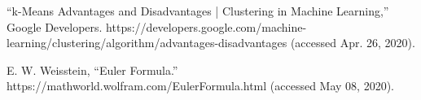 \documentclass[conference]{IEEEtran}
\begin{document}
\begin{thebibliography}{00}


 “k-Means Advantages and Disadvantages | Clustering in Machine Learning,” Google Developers. https://developers.google.com/machine-learning/clustering/algorithm/advantages-disadvantages (accessed Apr. 26, 2020).

E. W. Weisstein, “Euler Formula.” https://mathworld.wolfram.com/EulerFormula.html (accessed May 08, 2020).




\end{thebibliography}
\end{document}

